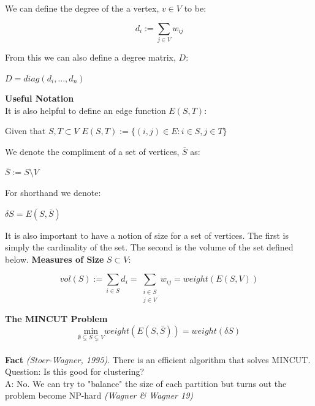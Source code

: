 {We can define the degree of the a vertex, $v \in V$ to be:
\begin{center}
	\[ d_i := \sum_{j \in V} w_{ij}\]
\end{center}

From this we can also define a degree matrix, $D$:
\begin{center}
	$D = diag(d_i, ..., d_n)$	
\end{center}

\textbf{Useful Notation}\\
It is also helpful to define an edge function $E(S,T)$:
\begin{center}
	Given that $S, T \subset V$ $ E(S,T) := \{(i,j) \in E : i \in S, j \in T\}$\\
\end{center}

We denote the compliment of a set of vertices, $\bar{S}$ as:
\begin{center}
	$\bar{S} := S \setminus V$
\end{center}

For shorthand we denote:
\begin{center}
	$\delta S = E(S, \bar{S})$
\end{center}

It is also important to have a notion of size for a set of vertices. The first is simply the cardinality of the set. The second is the volume of the set defined below.
\textbf{Measures of Size} $S \subset V$: \\
\begin{center}
	\item \[vol(S) := \sum_{i \in S} d_i = \sum_{\substack{i\in S \\
			j\in V}} w_{ij} = weight(E(S, V))\]
\end{center}


\textbf{The MINCUT Problem}\\
\[  \underset{{\emptyset \varsubsetneq S \varsubsetneq V}}{\mathrm{min}}  weight(E(S,\bar{S})) = weight(\delta S) \]\\

\textbf{Fact} \textit{(Stoer-Wagner, 1995)}. There is an efficient algorithm that solves MINCUT.\\
	
	Question: Is this good for clustering?\\
	A: No. We can try to "balance" the size of each partition but turns out the problem become NP-hard \textit{(Wagner \& Wagner 19)}\\
	
}

